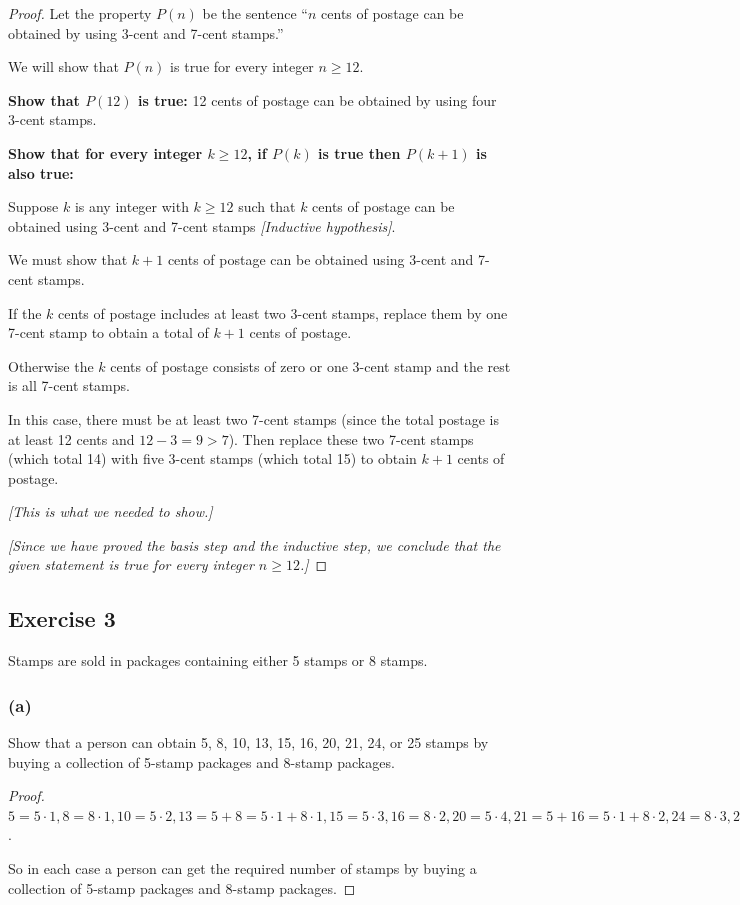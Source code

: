 \documentclass[14pt]{extarticle}
\begin{document}
\begin{proof}
Let the property $P(n)$ be the sentence “$n$ cents of postage can be obtained by using 3-cent and 7-cent stamps.” 

We will show that $P(n)$ is true for every integer $n \geq 12$. 

{\bf Show that $P(12)$ is true:} 12 cents of postage can be obtained by using four 3-cent stamps.

{\bf Show that for every integer $k \geq 12$, if $P(k)$ is true then $P(k + 1)$ is also true:} 

Suppose $k$ is any integer with $k \geq 12$ such that $k$ cents of postage can be obtained using 3-cent and 7-cent stamps {\it [Inductive hypothesis]}. 

We must show that $k + 1$ cents of postage can be obtained using 3-cent and 7-cent stamps. 

If the $k$ cents of postage includes at least two 3-cent stamps, replace them by one 7-cent stamp to obtain a total of $k + 1$ cents of postage. 

Otherwise the $k$ cents of postage consists of zero or one 3-cent stamp and the rest is all 7-cent stamps.

In this case, there must be at least two 7-cent stamps (since the total postage is at least 12 cents and $12 - 3 = 9 > 7$). Then replace these two 7-cent stamps (which total 14) with five 3-cent stamps (which total 15) to obtain $k+1$ cents of postage. 

{\it [This is what we needed to show.]}

{\it [Since we have proved the basis step and the inductive step, we conclude that the given statement is true for every integer $n \geq 12$.]}
\end{proof}

\subsection{Exercise 3}
Stamps are sold in packages containing either 5 stamps or 8 stamps.

\subsubsection{(a)}
Show that a person can obtain 5, 8, 10, 13, 15, 16, 20, 21, 24, or 25 stamps by buying a collection of 5-stamp packages and 8-stamp packages.

\begin{proof}
$5 = 5 \cdot 1, 8 = 8 \cdot 1, 10 = 5 \cdot 2, 13 = 5 + 8 = 5 \cdot 1 + 8 \cdot 1, 15 = 5 \cdot 3, 16 = 8 \cdot 2, 20 = 5 \cdot 4, 21 = 5 + 16 = 5 \cdot 1 + 8 \cdot 2, 24 = 8 \cdot 3, 25 = 5 \cdot 5$.

So in each case a person can get the required number of stamps by buying a collection of 5-stamp packages and 8-stamp packages.
\end{proof}
\end{document}
